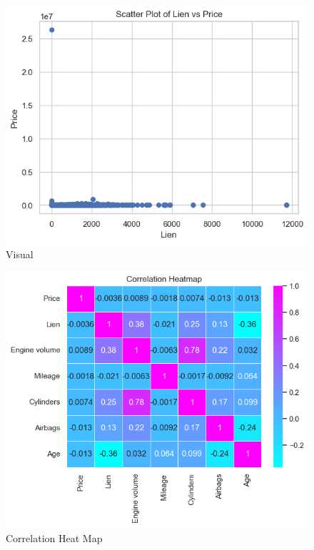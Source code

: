 \documentclass[paper=a4, fontsize=11pt,twoside]{scrartcl}
\begin{document}
\begin{figure}[h!]
\includegraphics[width=\textwidth]{scat.png}
\caption{\label{fig:your-figure}Visual}
\end{figure}


\begin{figure}[h!]
\includegraphics[width=\textwidth]{heat.png}
\caption{\label{fig:your-figure}Correlation Heat Map}
\end{figure}
\end{document}

